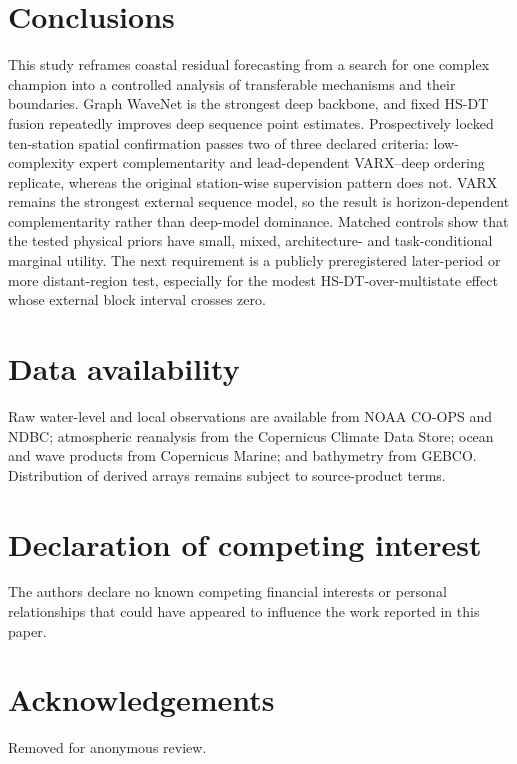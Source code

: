 \documentclass[final,5p,times,twocolumn]{elsarticle}
\begin{document}
\section{Conclusions}
This study reframes coastal residual forecasting from a search for one complex champion into a controlled analysis of transferable mechanisms and their boundaries. Graph WaveNet is the strongest deep backbone, and fixed HS-DT fusion repeatedly improves deep sequence point estimates. Prospectively locked ten-station spatial confirmation passes two of three declared criteria: low-complexity expert complementarity and lead-dependent VARX--deep ordering replicate, whereas the original station-wise supervision pattern does not. VARX remains the strongest external sequence model, so the result is horizon-dependent complementarity rather than deep-model dominance. Matched controls show that the tested physical priors have small, mixed, architecture- and task-conditional marginal utility. The next requirement is a publicly preregistered later-period or more distant-region test, especially for the modest HS-DT-over-multistate effect whose external block interval crosses zero.

\section*{Data availability}
Raw water-level and local observations are available from NOAA CO-OPS and NDBC; atmospheric reanalysis from the Copernicus Climate Data Store; ocean and wave products from Copernicus Marine; and bathymetry from GEBCO. Distribution of derived arrays remains subject to source-product terms.

\section*{Declaration of competing interest}
The authors declare no known competing financial interests or personal relationships that could have appeared to influence the work reported in this paper.

\section*{Acknowledgements}
Removed for anonymous review.



\end{document}
